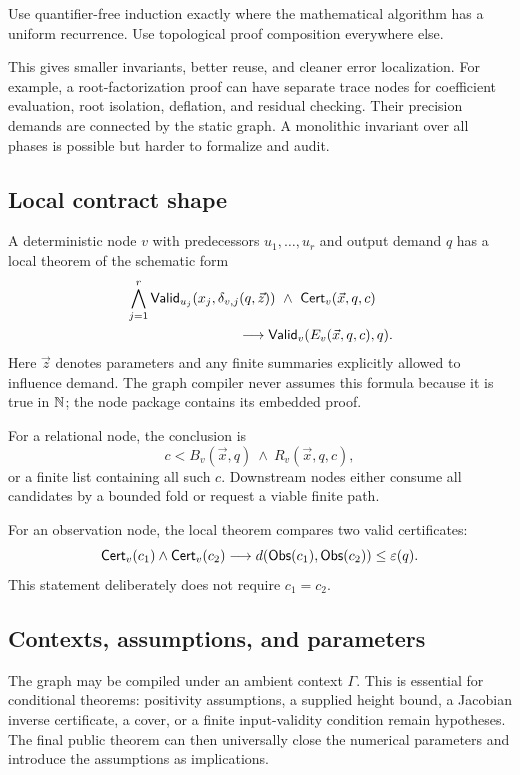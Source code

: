 \begin{principle}
Use quantifier-free induction exactly where the mathematical algorithm has a
uniform recurrence.  Use topological proof composition everywhere else.
\end{principle}

This gives smaller invariants, better reuse, and cleaner error localization.
For example, a root-factorization proof can have separate trace nodes for
coefficient evaluation, root isolation, deflation, and residual checking.
Their precision demands are connected by the static graph.  A monolithic
invariant over all phases is possible but harder to formalize and audit.

\subsection{Local contract shape}

A deterministic node \(v\) with predecessors \(u_1,\ldots,u_r\) and output
demand \(q\) has a local theorem of the schematic form
\begin{align*}
 &\bigwedge_{j=1}^{r}
 \mathsf{Valid}_{u_j}(x_j,\delta_{v,j}(q,\vec z))
 \ \wedge\ \mathsf{Cert}_v(\vec x,q,c)
 \\
 &\hspace{8em}\longrightarrow
 \mathsf{Valid}_v(E_v(\vec x,q,c),q).
\end{align*}
Here \(\vec z\) denotes parameters and any finite summaries explicitly
allowed to influence demand.  The graph compiler never assumes this formula
because it is true in \(\mathbb{N}\); the node package contains its embedded proof.

For a relational node, the conclusion is
\[
  c<B_v(\vec x,q)\ \wedge\ R_v(\vec x,q,c),
\]
or a finite list containing all such \(c\).  Downstream nodes either consume
all candidates by a bounded fold or request a viable finite path.

For an observation node, the local theorem compares two valid certificates:
\[
 \mathsf{Cert}_v(c_1)\wedge\mathsf{Cert}_v(c_2)
 \longrightarrow d(\mathsf{Obs}(c_1),\mathsf{Obs}(c_2))\leq\varepsilon(q).
\]
This statement deliberately does not require \(c_1=c_2\).

\subsection{Contexts, assumptions, and parameters}

The graph may be compiled under an ambient context \(\Gamma\).  This is
essential for conditional theorems: positivity assumptions, a supplied height
bound, a Jacobian inverse certificate, a cover, or a finite input-validity
condition remain hypotheses.  The final public theorem can then universally
close the numerical parameters and introduce the assumptions as implications.

